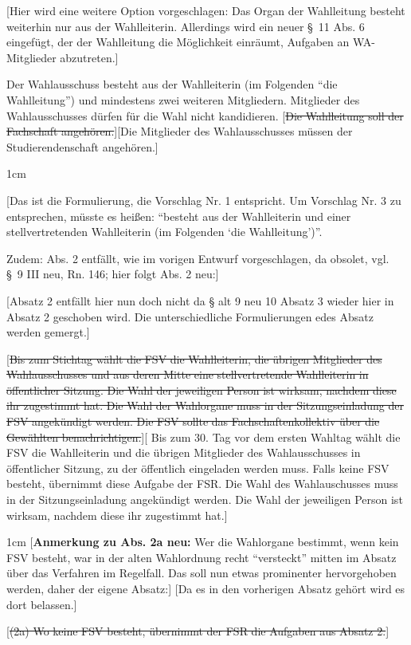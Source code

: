 \documentclass[%
draft,%
multilinesections%
]{fswo}
\newcommand\oldT[1]  {{\color{Gray}[\st{#1}]}}
\newcommand\newT[1]  {{\color{Green}[#1]}}
\newcommand\bemFr[1] {{\color{Red}[#1]}}
\newcommand\bemFe[1] {{\color{Cyan}[#1]}}
\newcommand\bemTi[1] {{\color{Cyan}[#1]}} %
\newcommand\remark[1]{\begin{addmargin}{1cm}#1\end{addmargin}}
\newcommand\oldT[1]{}%
\newcommand\newT[1]{#1}
\newcommand\bemFr[1]{}%
\newcommand\bemFe[1]{}%
\newcommand\bemTi[1]{}%
\newcommand\remark[1]{}
\newcommand\change[2]{\oldT{#1}\newT{#2}}
\begin{document}
\bemFe{Hier wird eine weitere Option vorgeschlagen: Das Organ der Wahlleitung besteht weiterhin nur aus der Wahlleiterin. Allerdings wird ein neuer \S~11 Abs. 6 eingefügt, der der Wahlleitung die Möglichkeit einräumt, Aufgaben an WA-Mitglieder abzutreten.}

\begin{contract}
Der Wahlausschuss besteht aus der Wahlleiterin (im Folgenden \enquote{die Wahlleitung}) und mindestens zwei weiteren Mitgliedern.
Mitglieder des Wahlausschusses dürfen für die Wahl nicht kandidieren.
\change{Die Wahlleitung soll der Fachschaft angehören.}{Die Mitglieder des Wahlausschusses müssen der Studierendenschaft angehören.}%
%
\remark{%
\bemFr{Das ist die Formulierung, die Vorschlag Nr. 1 entspricht.
Um Vorschlag Nr. 3 zu entsprechen, müsste es heißen: \enquote{besteht aus der Wahlleiterin und einer stellvertretenden Wahlleiterin (im Folgenden \enquote{die Wahlleitung})}.

Zudem: Abs. 2 entfällt, wie im vorigen Entwurf vorgeschlagen, da obsolet, vgl. \S~9 III neu, Rn. 146; hier folgt Abs. 2 neu:}
}
\bemTi{Absatz 2 entfällt hier nun doch nicht da § alt 9 neu 10 Absatz 3 wieder hier in Absatz 2 geschoben wird. Die unterschiedliche Formulierungen edes Absatz werden gemergt.}

\change{Bis zum Stichtag wählt die FSV die Wahlleiterin, die übrigen Mitglieder des Wahlausschusses und aus deren Mitte eine stellvertretende Wahlleiterin in öffentlicher Sitzung.
Die Wahl der jeweiligen Person ist wirksam, nachdem diese ihr zugestimmt hat.
Die Wahl der Wahlorgane muss in der Sitzungseinladung der FSV angekündigt werden.
Die FSV sollte das Fachschaftenkollektiv über die Gewählten benachrichtigen.}{%
Bis zum 30. Tag vor dem ersten Wahltag wählt die FSV die Wahlleiterin und die übrigen Mitglieder des Wahlausschusses in öffentlicher Sitzung, zu der öffentlich eingeladen werden muss.
Falls keine FSV besteht, übernimmt diese Aufgabe der FSR.
Die Wahl des Wahlauschusses muss in der Sitzungseinladung angekündigt werden.
Die Wahl der jeweiligen Person ist wirksam, nachdem diese ihr zugestimmt hat.}
%
\remark{%
\bemFr{\textbf{Anmerkung zu Abs. 2a neu:} Wer die Wahlorgane bestimmt, wenn kein FSV besteht,
war in der alten Wahlordnung recht \enquote{versteckt} mitten im Absatz über das Verfahren im Regelfall.
Das soll nun etwas prominenter hervorgehoben werden, daher der eigene Absatz:}
\bemTi{Da es in den vorherigen Absatz gehört wird es dort belassen.}
}
%
\oldT{(2a) Wo keine FSV besteht, übernimmt der FSR die Aufgaben aus Absatz 2.}



\end{contract}
\end{document}
